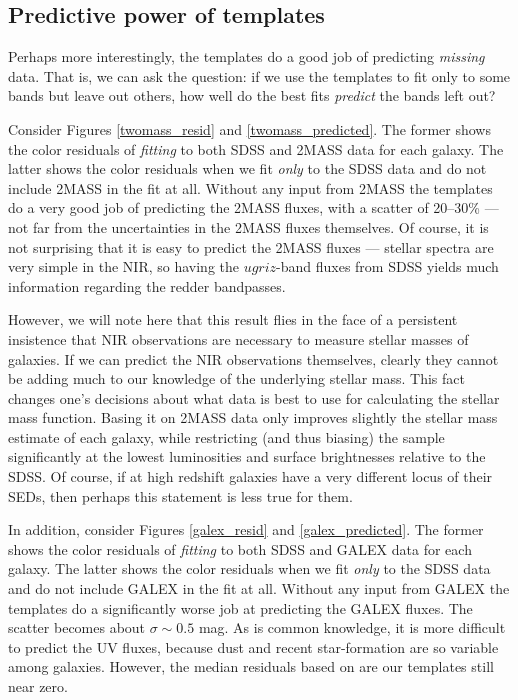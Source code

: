 \documentclass[10pt,preprint]{aastex}
\begin{document}
\subsection{Predictive power of templates}

Perhaps more interestingly, the templates do a good job of predicting
{\it missing} data. That is, we can ask the question: if we use the
templates to fit only to some bands but leave out others, how well do
the best fits {\it predict} the bands left out?
    
Consider Figures \ref{twomass_resid} and \ref{twomass_predicted}. The
former shows the color residuals of {\it fitting} to both SDSS and
2MASS data for each galaxy. The latter shows the color residuals when
we fit {\it only} to the SDSS data and do not include 2MASS in the fit
at all. Without any input from 2MASS the templates do a very good job
of predicting the 2MASS fluxes, with a scatter of 20--30\% --- not far
from the uncertainties in the 2MASS fluxes themselves. Of course, it
is not surprising that it is easy to predict the 2MASS fluxes ---
stellar spectra are very simple in the NIR, so having the $ugriz$-band
fluxes from SDSS yields much information regarding the redder
bandpasses.

However, we will note here that this result flies in the face of a
persistent insistence that NIR observations are necessary to measure
stellar masses of galaxies. If we can predict the NIR observations
themselves, clearly they cannot be adding much to our knowledge of the
underlying stellar mass. This fact changes one's decisions about what
data is best to use for calculating the stellar mass function.  Basing
it on 2MASS data only improves slightly the stellar mass estimate of
each galaxy, while restricting (and thus biasing) the sample
significantly at the lowest luminosities and surface brightnesses
relative to the SDSS. Of course, if at high redshift galaxies have
a very different locus of their SEDs, then perhaps this statement is
less true for them.

In addition, consider Figures \ref{galex_resid} and
\ref{galex_predicted}. The former shows the color residuals of {\it
fitting} to both SDSS and GALEX data for each galaxy. The latter shows
the color residuals when we fit {\it only} to the SDSS data and do not
include GALEX in the fit at all. Without any input from GALEX the
templates do a significantly worse job at predicting the GALEX
fluxes. The scatter becomes about $\sigma \sim 0.5$ mag.  As is common
knowledge, it is more difficult to predict the UV fluxes, because dust
and recent star-formation are so variable among galaxies. However, the
median residuals based on are our templates still near zero.
\end{document}
